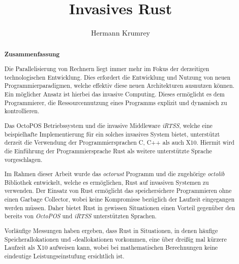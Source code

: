 \documentclass[parskip=full,12pt,a4paper,twoside,headings=openright]{scrreprt}
\title{Invasives Rust}
\author{Hermann Krumrey}
\begin{document}
\begin{otherlanguage}{ngerman} %
\mytitlepage
\end{otherlanguage}

\begin{abstract}
\begin{center}\Huge\textbf{\textsf{Zusammenfassung}}
\end{center}
\vfill

Die Parallelisierung von Rechnern liegt immer mehr im Fokus der derzeitigen technologischen Entwicklung.
Dies erfordert die Entwicklung und Nutzung von neuen Programmierparadigmen, welche effektiv
diese neuen Architekturen ausnutzen können. Ein möglicher Ansatz ist hierbei das
invasive Computing. Dieses ermöglicht es dem Programmierer, die Ressourcennutzung
eines Programms explizit und dynamisch zu kontrollieren.

Das OctoPOS Betriebssystem und die invasive Middleware \textit{iRTSS},
welche eine beispielhafte Implementierung für ein solches
invasives System bietet, unterstützt derzeit die Verwendung der Programmiersprachen
C, C++ als auch X10. Hiermit wird die Einführung der Programmiersprache Rust als
weitere unterstützte Sprache vorgeschlagen.

Im Rahmen dieser Arbeit wurde das \textit{octorust} Programm und die zugehörige \textit{octolib} Bibliothek
entwickelt, welche es ermöglichen, Rust auf invasiven Systemen zu verwenden. Der Einsatz von Rust
ermöglicht das speichersichere Programmieren ohne einen Garbage Collector, wobei keine Kompromisse bezüglich
der Laufzeit eingegangen werden müssen. Daher bietet Rust in gewissen Situationen einen
Vorteil gegenüber den bereits von \textit{OctoPOS} und \textit{iRTSS} unterstützten Sprachen.

Vorläufige Messungen haben ergeben, dass Rust in Situationen, in denen häufige Speicherallokationen und
-deallokationen vorkommen, eine über dreißig mal kürzere Laufzeit als X10 aufweisen kann, wobei bei mathematischen
Berechnungen keine eindeutige Leistungseinstufung ersichtlich ist.

\vfill

\tiny
{}

\end{abstract}
\end{document}
